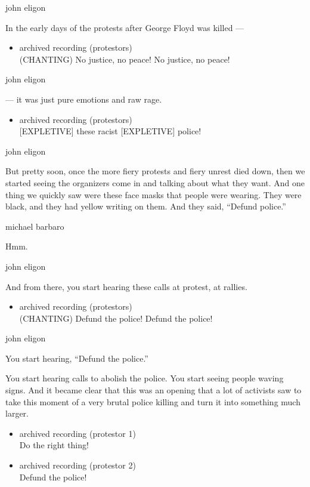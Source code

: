 john eligon

In the early days of the protests after George Floyd was killed ---

\begin{itemize}
\tightlist
\item
  archived recording (protestors)\\
  (CHANTING) No justice, no peace! No justice, no peace!
\end{itemize}

john eligon

--- it was just pure emotions and raw rage.

\begin{itemize}
\tightlist
\item
  archived recording (protestors)\\
  {[}EXPLETIVE{]} these racist {[}EXPLETIVE{]} police!
\end{itemize}

john eligon

But pretty soon, once the more fiery protests and fiery unrest died
down, then we started seeing the organizers come in and talking about
what they want. And one thing we quickly saw were these face masks that
people were wearing. They were black, and they had yellow writing on
them. And they said, ``Defund police.''

michael barbaro

Hmm.

john eligon

And from there, you start hearing these calls at protest, at rallies.

\begin{itemize}
\tightlist
\item
  archived recording (protestors)\\
  (CHANTING) Defund the police! Defund the police!
\end{itemize}

john eligon

You start hearing, ``Defund the police.''

You start hearing calls to abolish the police. You start seeing people
waving signs. And it became clear that this was an opening that a lot of
activists saw to take this moment of a very brutal police killing and
turn it into something much larger.

\begin{itemize}
\item
  archived recording (protestor 1)\\
  Do the right thing!
\item
  archived recording (protestor 2)\\
  Defund the police!
\end{itemize}


